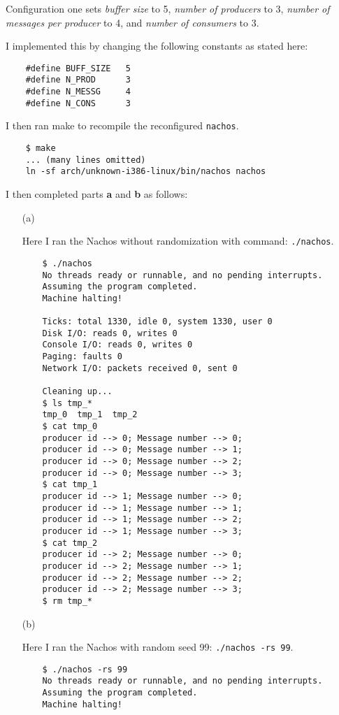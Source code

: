 \documentclass[11pt]{article}
\begin{document}
    \begin{question}
        Configuration one sets {\it buffer size} to 5, {\it number of producers} to 3,  {\it number of messages per producer} to 4, and {\it number of consumers} to 3.

    \begin{subquestion}
        I implemented this by changing the following constants as stated here:
        \begin{verbatim}
    #define BUFF_SIZE   5
    #define N_PROD      3
    #define N_MESSG     4
    #define N_CONS      3
        \end{verbatim}

        I then ran make to recompile the reconfigured {\tt nachos}.
        \begin{verbatim}
    $ make
    ... (many lines omitted)
    ln -sf arch/unknown-i386-linux/bin/nachos nachos
        \end{verbatim}

        I then completed parts {\bf a} and {\bf b} as follows:
        \begin{itemize}
            \item[(a)]{
                Here I ran the Nachos without randomization with command: {\tt ./nachos}.
                \begin{verbatim}
    $ ./nachos
    No threads ready or runnable, and no pending interrupts.
    Assuming the program completed.
    Machine halting!

    Ticks: total 1330, idle 0, system 1330, user 0
    Disk I/O: reads 0, writes 0
    Console I/O: reads 0, writes 0
    Paging: faults 0
    Network I/O: packets received 0, sent 0

    Cleaning up...
    $ ls tmp_*
    tmp_0  tmp_1  tmp_2
    $ cat tmp_0
    producer id --> 0; Message number --> 0;
    producer id --> 0; Message number --> 1;
    producer id --> 0; Message number --> 2;
    producer id --> 0; Message number --> 3;
    $ cat tmp_1
    producer id --> 1; Message number --> 0;
    producer id --> 1; Message number --> 1;
    producer id --> 1; Message number --> 2;
    producer id --> 1; Message number --> 3;
    $ cat tmp_2
    producer id --> 2; Message number --> 0;
    producer id --> 2; Message number --> 1;
    producer id --> 2; Message number --> 2;
    producer id --> 2; Message number --> 3;
    $ rm tmp_*
                \end{verbatim}
            }
            \item[(b)]{
                Here I ran the Nachos with random seed 99: {\tt ./nachos -rs 99}.
                \begin{verbatim}
    $ ./nachos -rs 99
    No threads ready or runnable, and no pending interrupts.
    Assuming the program completed.
    Machine halting!


\end{verbatim}}
\end{itemize}
\end{subquestion}
\end{question}
\end{document}
